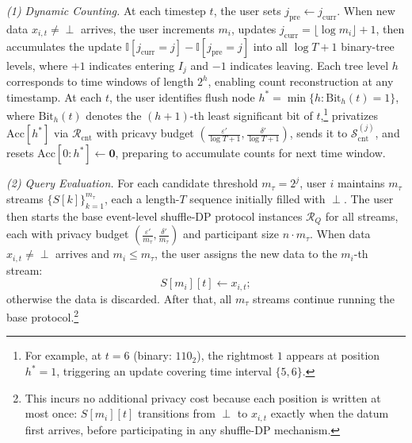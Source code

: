 \textit{(1) Dynamic Counting.}
At each timestep $t$, the user sets $j_{\text{pre}} \leftarrow j_{\text{curr}}$. 
When new data $x_{i,t} \neq \perp$ arrives, the user increments $m_i$, updates $j_{\text{curr}} = \lfloor \log m_i \rfloor + 1$, then accumulates the update $\mathbb{I}[j_{\text{curr}}=j] - \mathbb{I}[j_{\text{pre}}=j]$ into all $\log T+1$ binary-tree levels, where $+1$ indicates entering $I_j$ and $-1$ indicates leaving. 
Each tree level $h$ corresponds to time windows of length $2^h$, enabling count reconstruction at any timestamp.
At each $t$, the user identifies flush node $h^* = \min\{h : \text{Bit}_h(t) = 1\}$, where $\text{Bit}_h(t)$ denotes the $(h+1)$-th least significant bit of $t$,\footnote{For example, at $t=6$ (binary: $110_2$), the rightmost $1$ appears at position $h^*=1$, triggering an update covering time interval $\{5,6\}$.} privatizes $\text{Acc}[h^*]$ via $\mathcal{R}_{\text{cnt}}$ with pricavy budget $(\frac{\varepsilon'}{\log T+1}, \frac{\delta'}{\log T+1})$, sends it to $\mathcal{S}^{(j)}_{\text{cnt}}$, and resets $\text{Acc}[0:h^*] \leftarrow \mathbf{0}$, preparing to accumulate counts for next time window.


\textit{(2) Query Evaluation.}
For each candidate threshold $m_\tau = 2^j$, user $i$ maintains $m_\tau$ streams $\{S[k]\}_{k=1}^{m_\tau}$, each a length-$T$ sequence initially filled with $\perp$. 
The user then starts the base event-level shuffle-DP protocol instances $\mathcal{R}_Q$ for all streams, each with privacy budget $(\frac{\varepsilon'}{m_\tau}, \frac{\delta'}{m_\tau})$ and participant size $n \cdot m_\tau$. 
When data $x_{i,t} \neq \perp$ arrives and $m_i \le m_\tau$, the user assigns the new data to the $m_i$-th stream: $$S[m_i][t] \leftarrow x_{i,t};$$ otherwise the data is discarded.
After that, all $m_\tau$ streams continue running the base protocol.\footnote{This incurs no additional privacy cost because each position is written at most once: $S[m_i][t]$ transitions from $\perp$ to $x_{i,t}$ exactly when the datum first arrives, before participating in any  shuffle-DP mechanism.}


